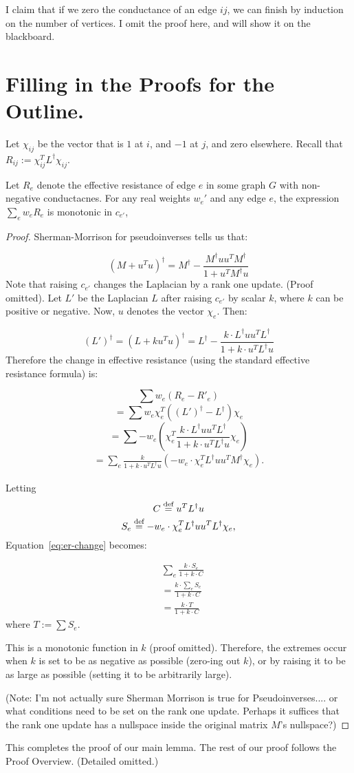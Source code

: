 I claim that if we zero the conductance of an edge $ij$, we can finish
by induction on the number of vertices. I omit the proof here, and will
show it on the blackboard.

\section{Filling in the Proofs for the Outline.}
Let $\chi_{ij}$ be the vector that is $1$ at $i$, and $-1$ at $j$, and zero
elsewhere. Recall that $R_{ij} := \chi_{ij}^T L^\dag \chi_{ij}$.
\begin{theorem}
Let $R_e$ denote the effective resistance of edge $e$ in some graph $G$
with non-negative conductacnes. For any real weights $w_e'$ and any edge
$e$, the expression $\sum_e w_e R_e$ is monotonic in $c_{e'}$,
\end{theorem}
\begin{proof}
Sherman-Morrison for pseudoinverses tells us that:

\[ (M + u^T u)^\dag = M^\dag - \frac{M^\dag u u^T M^\dag}{1 + u^T M^\dag u}
\]
Note that raising $c_{e'}$ changes the Laplacian by a rank one update.
(Proof omitted). Let $L'$ be the Laplacian $L$ after raising $c_{e'}$ by
scalar $k$, where $k$ can be positive or negative. Now, $u$ denotes the
vector $\chi_e$.  Then:

\[ (L')^\dag = (L + ku^T u)^\dag = L^\dag -
\frac{k \cdot L^\dag u u^T L^\dag}{1 + k \cdot u^T L^\dag u}
\]
Therefore the change in effective resistance (using the standard
    effective resistance formula) is:

\[ \sum w_e (R_e - R'_e) \]
\[ = \sum w_e \chi_e^T \left((L')^\dag - L^\dag\right) \chi_e \]
\[ = \sum -w_e \left(\chi_e^T \frac{k \cdot L^\dag u u^T L^\dag}{1 + k \cdot
  u^T L^\dag u} \chi_e\right)
 \]
\begin{align}
\label{eq:er-change}
= \sum_e \frac{k}{1+k\cdot u^T L^\dag u}
\left(-w_e \cdot 
    \chi_e^T L^\dag u u^T M^\dag \chi_e\right).
 \end{align}

 Letting 
 \[C \stackrel{\textup{def}}{=} u^T L^\dag u\]
 \[S_e \stackrel{\textup{def}}{=} - w_e \cdot \chi_e^T L^\dag u u^T L^\dag \chi_e, \]
 Equation~\ref{eq:er-change} becomes:

 \begin{align}
 &\sum_e \frac{k \cdot S_e }{1+k \cdot C}
 \\
 &= \frac{k \cdot \sum_e S_e }{1+k \cdot C}
 \\
 &= \frac{k \cdot T}{1+k \cdot C}
 \end{align}
 where $T := \sum S_e$.

 This is a monotonic function in $k$ (proof omitted). Therefore, the extremes occur when
 $k$ is set to be as negative as possible (zero-ing out $k$), or by
 raising it to be as large as possible (setting it to be arbitrarily
     large).

 (Note: I'm not actually sure Sherman Morrison is true for
  Pseudoinverses.... or what conditions need to be set on the rank one
  update. Perhaps it suffices that the rank one update has a nullspace
  inside the original matrix $M$'s nullspace?)
\end{proof}
This completes the proof of our main lemma. The rest of our proof
follows the Proof Overview. (Detailed omitted.)

